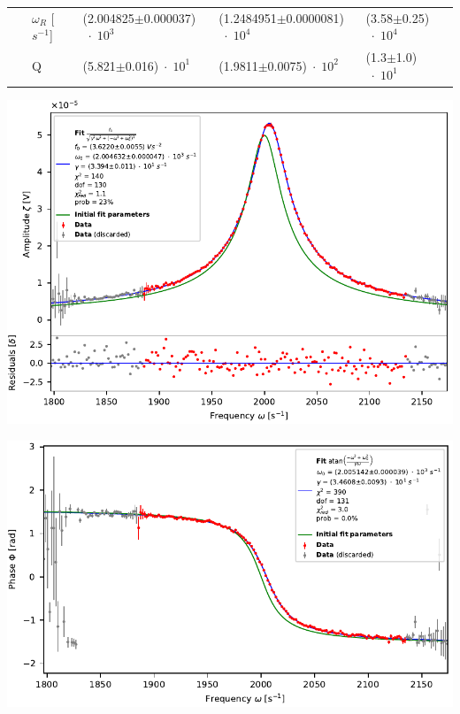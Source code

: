 \begin{center}
\begin{adjustbox}{max width=\linewidth, keepaspectratio}
\begin{tabular}{lllll}
            ~ & $\omega_R$ [$s^{-1}$] & (2.004825$\pm$0.000037)$\;\cdot\; 10^{3}$ & (1.2484951$\pm$0.0000081)$\;\cdot\; 10^{4}$ & (3.58$\pm$0.25)$\;\cdot\; 10^{4}$ \\
            ~ & Q & (5.821$\pm$0.016)$\;\cdot\; 10^{1}$ & (1.9811$\pm$0.0075)$\;\cdot\; 10^{2}$ & (1.3$\pm$1.0)$\;\cdot\; 10^{1}$ \\
            \bottomrule
            \end{tabular}
        \end{adjustbox}
        \label{tab:FitErgebnisse}
    \end{center}
\endminipage

\minipage{\linewidth}
    \begin{center}
        \captionsetup{type=figure}
        \begin{adjustbox}{max width=0.45\linewidth, keepaspectratio}
            \includegraphics[]{pdf/A_0_0}
        \end{adjustbox}
        \begin{adjustbox}{max width=0.45\linewidth, keepaspectratio}
            \includegraphics[]{pdf/Phi_0_0}

\end{adjustbox}
\end{center}
